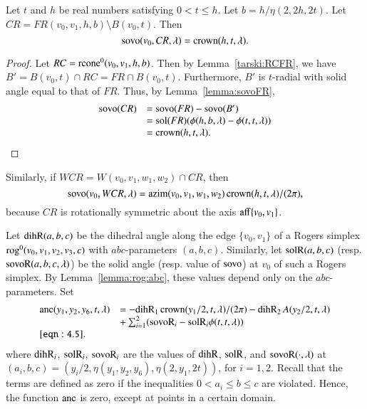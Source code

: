\begin{lemma}\label{lemma:sovo:CR} 
Let $t$ and $h$ be real numbers satisfying 
$0 < t \le h$.
Let $b=h/\eta(2,2h,2t)$.
Let $CR=FR(v_0,v_1,h,b) \setminus B(v_0,t)$.
  Then
$${\operatorname{sovo}}(v_0,CR,\lambda) = \operatorname{crown}(h,t,\lambda).$$
\end{lemma}

\begin{proof}  Let $RC={\operatorname{rcone}}^0(v_0,v_1,h,b)$.
Then by Lemma~\ref{tarski:RCFR}, we have
$B' = B(v_0,t)\cap RC = FR\cap B(v_0,t)$.
Furthermore, $B'$ is $t$-radial with solid angle equal to that
of $FR$.  Thus, by Lemma~\ref{lemma:sovoFR},
$$
\begin{array}{lll}
{\operatorname{sovo}}(CR) &= {\operatorname{sovo}}(FR) - {\operatorname{sovo}}(B')\\
 &= {\operatorname{sol}}(FR) (\phi(h,b,\lambda) - \phi(t,t,\lambda))\\
 &= \operatorname{crown}(h,t,\lambda).
\end{array}
$$
\end{proof}

Similarly, if $WCR = W(v_0,v_1,w_1,w_2) \cap CR$, then
$$
{\operatorname{sovo}}(v_0,WCR,\lambda) = {\operatorname{azim}}(v_0,v_1,w_1,w_2)\operatorname{crown}(h,t,\lambda)/(2\pi),
$$
because $CR$ 
is rotationally symmetric about the axis ${\operatorname{aff}}\{v_0,v_1\}$.



Let ${\operatorname{dihR}}(a,b,c)$ be the dihedral angle along the edge
$\{v_0,v_1\}$ of a
Rogers simplex ${\operatorname{rog}}^0(v_0,v_1,v_2,v_3,c)$ with $abc$-parameters
$(a,b,c)$.  Similarly, let ${\operatorname{solR}}(a,b,c)$ (resp. ${\operatorname{sovoR}}(a,b,c,\lambda)$)
be the solid angle (resp. value of ${\operatorname{sovo}}$)
at $v_0$ of such a Rogers simplex.  By Lemma~\ref{lemma:rog:abc},
these values depend only on the $abc$-parameters.
Set
    \begin{equation}
    \begin{array}{lll}
    \anc(y_1,y_2,y_6,t,\lambda) &= 
     -\op{dihR}_1\cro(y_1/2,t,\lambda)/(2\pi)
    -\op{dihR}_2\, A(y_2/2,t,\lambda) \\
      &+\sum_{i=1}^2 (\op{sovoR}_i - \op{solR}_i \phi(t,t,\lambda))\\
    \tlabel{eqn:4.5}
    \end{array}
    \end{equation}
where ${\operatorname{dihR}}_i$, ${\operatorname{solR}}_i$, ${\operatorname{sovoR}}_i$ are the values
of ${\operatorname{dihR}}$, ${\operatorname{solR}}$, and ${\operatorname{sovoR}}(\cdot,\lambda)$
at $(a_i,b,c) = (y_i/2,\eta(y_1,y_2,y_6),\eta(2,y_1,2t))$, for $i=1,2$.
Recall that the terms are defined as zero if the inequalities
$0 < a_i \le b\le c$ are violated.  Hence, the function $\operatorname{anc}$ is
zero, except at points in a certain domain.

